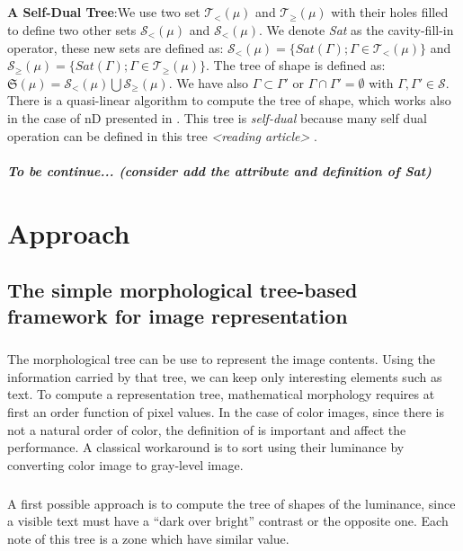\documentclass[12pt,a4paper]{report}
\begin{document}
\paragraph{} \textbf{A Self-Dual Tree}:We use two set $ \mathcal{T}_< (\mu)$ and $ \mathcal{T}_\geq (\mu)$ with their holes filled to define two other sets $ \mathcal{S}_< (\mu)$ and $ \mathcal{S}_< (\mu)$. We denote \textit{Sat} as the cavity-fill-in operator, these new sets are defined as: $ \mathcal{S}_< (\mu) = \lbrace Sat(\Gamma);\Gamma \in \mathcal{T}_<(\mu)\rbrace$ and $ \mathcal{S}_\geq (\mu) = \lbrace Sat(\Gamma);\Gamma \in \mathcal{T}_\geq (\mu)\rbrace$. The tree of shape is defined as: $\mathfrak{S}(\mu) = \mathcal{S}_< (\mu) \bigcup \mathcal{S}_\geq (\mu) $. We have also $\Gamma \subset \Gamma ' $ or $\Gamma \cap \Gamma '= \emptyset$ with $\Gamma , \Gamma ' \in \mathcal{S}$. There is a quasi-linear algorithm to compute the tree of shape, which works also in the case of nD presented in \cite{geraud.13.ismm}. This tree is \textit{self-dual} because many self dual operation can be defined in this tree \textit{<reading article>}  .
	
\paragraph{To be continue... (consider add the attribute and definition of Sat)}

\chapter{Approach} \label{Approach}
\section{The simple morphological tree-based framework for image representation}
\paragraph{}
The morphological tree can be use to represent the image contents. Using the information carried by that tree, we can keep only interesting elements such as text. To compute a representation tree, mathematical morphology requires at first an order function of pixel values. In the case of color images, since there is not a natural order of color, the definition of is important and affect the performance. A classical workaround is to sort using their luminance by converting color image to gray-level image. 
\paragraph{}
A first possible approach is to compute the tree of shapes of the luminance, since a visible text must have a “dark over bright” contrast or the opposite one. Each note of this tree is a zone which have similar value.
\end{document}
